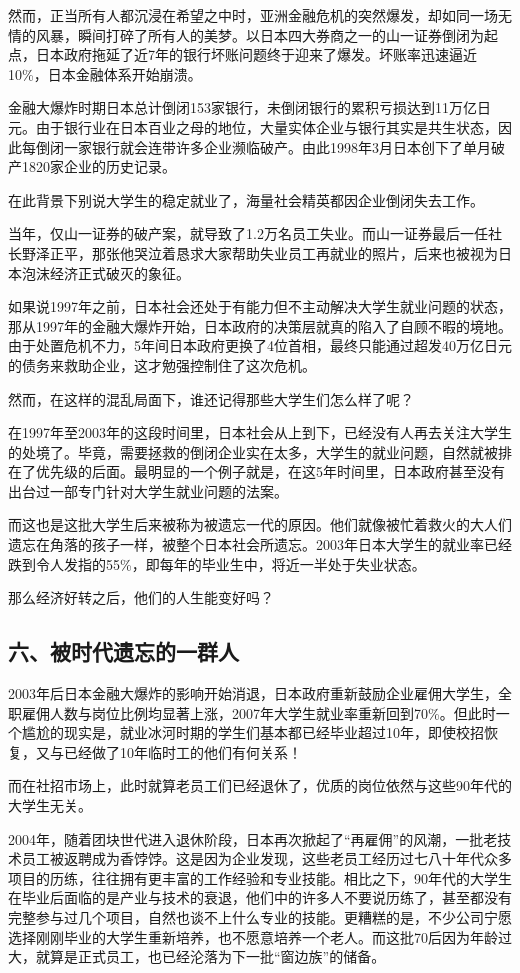 然而，正当所有人都沉浸在希望之中时，亚洲金融危机的突然爆发，却如同一场无情的风暴，瞬间打碎了所有人的美梦。以日本四大券商之一的山一证券倒闭为起点，日本政府拖延了近7年的银行坏账问题终于迎来了爆发。坏账率迅速逼近10\%，日本金融体系开始崩溃。

金融大爆炸时期日本总计倒闭153家银行，未倒闭银行的累积亏损达到11万亿日元。由于银行业在日本百业之母的地位，大量实体企业与银行其实是共生状态，因此每倒闭一家银行就会连带许多企业濒临破产。由此1998年3月日本创下了单月破产1820家企业的历史记录。

在此背景下别说大学生的稳定就业了，海量社会精英都因企业倒闭失去工作。

当年，仅山一证券的破产案，就导致了1.2万名员工失业。而山一证券最后一任社长野泽正平，那张他哭泣着恳求大家帮助失业员工再就业的照片，后来也被视为日本泡沫经济正式破灭的象征。

如果说1997年之前，日本社会还处于有能力但不主动解决大学生就业问题的状态，那从1997年的金融大爆炸开始，日本政府的决策层就真的陷入了自顾不暇的境地。由于处置危机不力，5年间日本政府更换了4位首相，最终只能通过超发40万亿日元的债务来救助企业，这才勉强控制住了这次危机。

然而，在这样的混乱局面下，谁还记得那些大学生们怎么样了呢？

在1997年至2003年的这段时间里，日本社会从上到下，已经没有人再去关注大学生的处境了。毕竟，需要拯救的倒闭企业实在太多，大学生的就业问题，自然就被排在了优先级的后面。最明显的一个例子就是，在这5年时间里，日本政府甚至没有出台过一部专门针对大学生就业问题的法案。

而这也是这批大学生后来被称为被遗忘一代的原因。他们就像被忙着救火的大人们遗忘在角落的孩子一样，被整个日本社会所遗忘。2003年日本大学生的就业率已经跌到令人发指的55\%，即每年的毕业生中，将近一半处于失业状态。

那么经济好转之后，他们的人生能变好吗？

\subsection{六、被时代遗忘的一群人}

2003年后日本金融大爆炸的影响开始消退，日本政府重新鼓励企业雇佣大学生，全职雇佣人数与岗位比例均显著上涨，2007年大学生就业率重新回到70\%。但此时一个尴尬的现实是，就业冰河时期的学生们基本都已经毕业超过10年，即使校招恢复，又与已经做了10年临时工的他们有何关系！

而在社招市场上，此时就算老员工们已经退休了，优质的岗位依然与这些90年代的大学生无关。

2004年，随着团块世代进入退休阶段，日本再次掀起了“再雇佣”的风潮，一批老技术员工被返聘成为香饽饽。这是因为企业发现，这些老员工经历过七八十年代众多项目的历练，往往拥有更丰富的工作经验和专业技能。相比之下，90年代的大学生在毕业后面临的是产业与技术的衰退，他们中的许多人不要说历练了，甚至都没有完整参与过几个项目，自然也谈不上什么专业的技能。更糟糕的是，不少公司宁愿选择刚刚毕业的大学生重新培养，也不愿意培养一个老人。而这批70后因为年龄过大，就算是正式员工，也已经沦落为下一批“窗边族”的储备。

